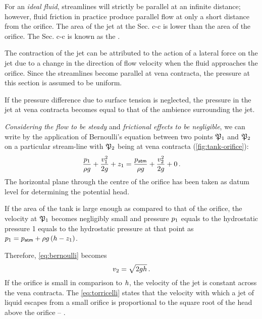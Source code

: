 For an \emph{ideal fluid}, streamlines will strictly be parallel at an infinite distance; however, fluid friction in practice produce parallel flow at only a short distance from the orifice. The area of the jet at the Sec. c-c is lower than the area of the orifice. The Sec. c-c is known as the .

The contraction of the jet can be attributed to the action of a lateral force on the jet due to a change in the direction of flow velocity when the fluid approaches the orifice. Since the streamlines become parallel at vena contracta, the pressure at this section is assumed to be uniform. 

If the pressure difference due to surface tension is neglected, the pressure in the jet at vena contracta becomes equal to that of the ambience surrounding the jet.

\emph{Considering the flow to be steady} and \emph{frictional effects to be negligible}, we can write by the application of Bernoulli's equation between two points $\mathfrak{P}_1$ and $\mathfrak{P}_2$ on a particular stream-line with $\mathfrak{P}_2$ being at vena contracta (\cref{fig:tank-orifice}):
%
\begin{equation}\label{eq:bernoulli}
  \dfrac{p_1}{\rho g} + \dfrac{v_1^2}{2g} + z_1 = 
  \dfrac{p_{\text{\sffamily atm}}}{\rho g} + \dfrac{v_2^2}{2g} + 0\,.
\end{equation}
%
The horizontal plane through the centre of the orifice has been taken as datum level for determining the potential head. 

If the area of the tank is large enough as compared to that of the orifice, the velocity at $\mathfrak{P}_
1$ becomes negligibly small and pressure $p_1$ equals to the hydrostatic pressure 1 equals to the hydrostatic pressure at that point as $p_1 = p_{\text{\sffamily atm}} + \rho g \left({h - z_1}\right)$.

Therefore, \cref{eq:bernoulli} becomes
%
\begin{equation}\label{eq:torricelli}
  v_2 = \sqrt{2gh}\,.
\end{equation}
%
If the orifice is small in comparison to $h$, the velocity of the jet is constant across the vena contracta. The \cref{eq:torricelli} states that the velocity with which a jet of liquid escapes from a small orifice is proportional to the square root of the head above the orifice -- .

